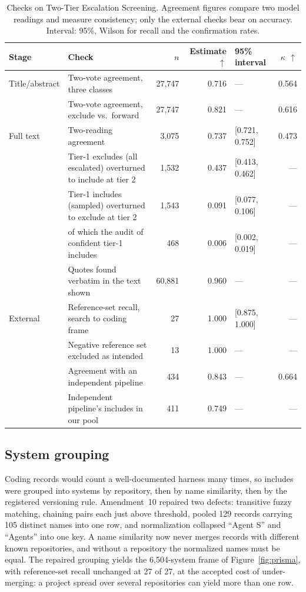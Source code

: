 \begin{table}[t]
  \footnotesize
  \caption{Checks on Two-Tier Escalation Screening. Agreement figures compare two model readings and measure
  consistency; only the external checks bear on accuracy. Interval: 95\%, Wilson
  \citep{wilson1927interval} for recall and the confirmation rates.}
  \label{tab:screening-checks}
  \begin{tabular}{@{}l l r r l r@{}}
    \toprule
    Stage & Check & $n$ & Estimate $\uparrow$ & 95\% interval & $\kappa$ $\uparrow$ \\
    \midrule
    Title/abstract & Two-vote agreement, three classes & 27,747 & 0.716 & --- & 0.564 \\
                   & Two-vote agreement, exclude vs.\ forward & 27,747 & 0.821 & --- & 0.616 \\
    \midrule
    Full text & Two-reading agreement & 3,075 & 0.737 & [0.721, 0.752] & 0.473 \\
              & Tier-1 excludes (all escalated) overturned to include at tier 2 & 1,532 & 0.437 & [0.413, 0.462] & --- \\
              & Tier-1 includes (sampled) overturned to exclude at tier 2 & 1,543 & 0.091 & [0.077, 0.106] & --- \\
              & \quad of which the audit of confident tier-1 includes & 468 & 0.006 & [0.002, 0.019] & --- \\
              & Quotes found verbatim in the text shown & 60,881 & 0.960 & --- & --- \\
    \midrule
    External & Reference-set recall, search to coding frame & 27 & 1.000 & [0.875, 1.000] & --- \\
             & Negative reference set excluded as intended & 13 & 1.000 & --- & --- \\
             & Agreement with an independent pipeline & 434 & 0.843 & --- & 0.664 \\
             & Independent pipeline's includes in our pool & 411 & 0.749 & --- & --- \\
    \bottomrule
  \end{tabular}
\end{table}

\subsection{System grouping}\label{subsec:grouping}

Coding records would count a well-documented harness many times, so includes were grouped into systems
by repository, then by name similarity, then by the registered versioning rule. Amendment~10 repaired two
defects: transitive fuzzy matching, chaining pairs each just above threshold, pooled 129 records carrying
105 distinct names into one row, and normalization collapsed ``Agent S'' and ``Agents'' into one key. A
name similarity now never merges records with different known repositories, and without a repository
the normalized names must be equal. The repaired grouping yields the 6,504-system frame of
Figure~\ref{fig:prisma}, with reference-set recall unchanged at 27 of 27, at the accepted cost of
under-merging: a project spread over several repositories can yield more than one row.


